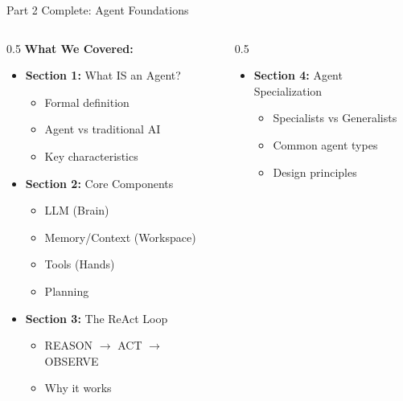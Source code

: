 \documentclass[aspectratio=169, 11pt]{beamer}
\begin{document}
\begin{frame}{Part 2 Complete: Agent Foundations}
    \begin{columns}[T]
        \begin{column}{0.5\textwidth}
            \textbf{What We Covered:}
            \begin{itemize}
                \item \textbf{Section 1:} What IS an Agent?
                \begin{itemize}
                    \footnotesize
                    \item Formal definition
                    \item Agent vs traditional AI
                    \item Key characteristics
                \end{itemize}

                \item \textbf{Section 2:} Core Components
                \begin{itemize}
                    \footnotesize
                    \item LLM (Brain)
                    \item Memory/Context (Workspace)
                    \item Tools (Hands)
                    \item Planning
                \end{itemize}

                \item \textbf{Section 3:} The ReAct Loop
                \begin{itemize}
                    \footnotesize
                    \item REASON $\rightarrow$ ACT $\rightarrow$ OBSERVE
                    \item Why it works
                \end{itemize}
            \end{itemize}
        \end{column}
        \begin{column}{0.5\textwidth}
            \begin{itemize}
                \item \textbf{Section 4:} Agent Specialization
                \begin{itemize}
                    \footnotesize
                    \item Specialists vs Generalists
                    \item Common agent types
                    \item Design principles
                \end{itemize}


\end{itemize}
\end{column}
\end{columns}
\end{frame}
\end{document}
